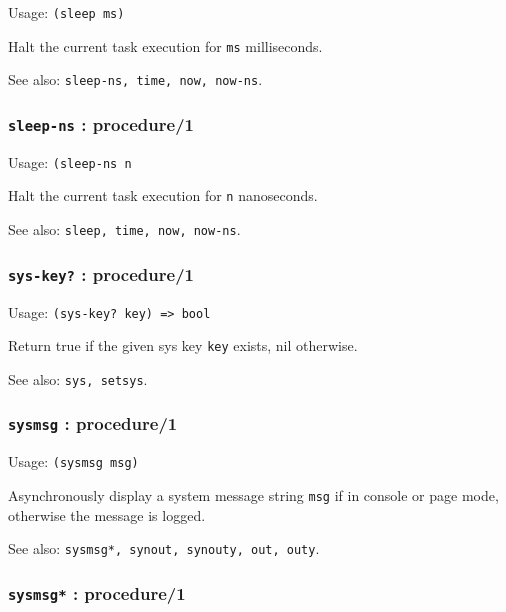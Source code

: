 \documentclass[
]{article}
\newcommand{\passthrough}[1]{#1}
\begin{document}
Usage: \passthrough{\lstinline!(sleep ms)!}

Halt the current task execution for \passthrough{\lstinline!ms!}
milliseconds.

See also: \passthrough{\lstinline!sleep-ns, time, now, now-ns!}.

\hypertarget{sleep-ns-procedure1}{%
\subsubsection{\texorpdfstring{\texttt{sleep-ns} :
procedure/1}{sleep-ns : procedure/1}}\label{sleep-ns-procedure1}}

Usage: \passthrough{\lstinline!(sleep-ns n!}

Halt the current task execution for \passthrough{\lstinline!n!}
nanoseconds.

See also: \passthrough{\lstinline!sleep, time, now, now-ns!}.

\hypertarget{sys-key-procedure1}{%
\subsubsection{\texorpdfstring{\texttt{sys-key?} :
procedure/1}{sys-key? : procedure/1}}\label{sys-key-procedure1}}

Usage: \passthrough{\lstinline!(sys-key? key) => bool!}

Return true if the given sys key \passthrough{\lstinline!key!} exists,
nil otherwise.

See also: \passthrough{\lstinline!sys, setsys!}.

\hypertarget{sysmsg-procedure1}{%
\subsubsection{\texorpdfstring{\texttt{sysmsg} :
procedure/1}{sysmsg : procedure/1}}\label{sysmsg-procedure1}}

Usage: \passthrough{\lstinline!(sysmsg msg)!}

Asynchronously display a system message string
\passthrough{\lstinline!msg!} if in console or page mode, otherwise the
message is logged.

See also: \passthrough{\lstinline!sysmsg*, synout, synouty, out, outy!}.

\hypertarget{sysmsg-procedure1-1}{%
\subsubsection{\texorpdfstring{\texttt{sysmsg*} :
procedure/1}{sysmsg* : procedure/1}}\label{sysmsg-procedure1-1}}
\end{document}

